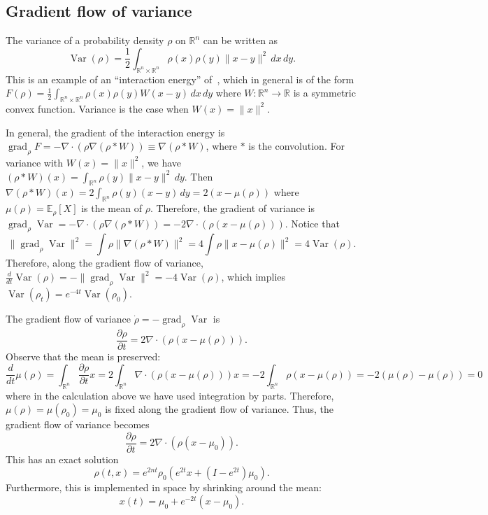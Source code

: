 \documentclass[final,12pt]{colt2018}
\newcommand{\R}{\mathbb{R}}
\newcommand{\E}{\mathbb{E}}
\renewcommand{\part}[2]{\frac{\partial #1}{\partial #2}}
\DeclareMathOperator{\grad}{grad}
\DeclareMathOperator{\Var}{Var}
\begin{document}
\subsection{Gradient flow of variance}
\label{App:Var}

The variance of a probability density $\rho$ on $\R^n$ can be written as
$$\Var(\rho) = \frac{1}{2} \int_{\R^n \times \R^n} \rho(x) \rho(y) \|x-y\|^2 \, dx \, dy.$$
This is an example of an ``interaction energy'' of~\cite[$\S5.2.2$]{Vil03}, which in general is of the form $F(\rho) = \frac{1}{2} \int_{\R^n \times \R^n} \rho(x) \rho(y) W(x-y) \, dx \, dy$ where $W \colon \R^n \to \R$ is a symmetric convex function.
Variance is the case when $W(x) = \|x\|^2$.

In general, the gradient of the interaction energy is $\grad_\rho F = -\nabla \cdot(\rho \nabla (\rho \ast W)) \equiv \nabla (\rho \ast W)$, where $\ast$ is the convolution.
For variance with $W(x) = \|x\|^2$, we have $(\rho \ast W)(x) = \int_{\R^n} \rho(y) \|x-y\|^2 \, dy$. 
Then $\nabla (\rho \ast W)(x) = 2 \int_{\R^n} \rho(y) (x-y) \, dy = 2(x-\mu(\rho))$ where $\mu(\rho) = \E_\rho[X]$ is the mean of $\rho$.
Therefore, the gradient of variance is
$\grad_\rho \Var = -\nabla \cdot (\rho \nabla (\rho \ast W)) = -2\nabla \cdot (\rho (x-\mu(\rho)))$.
Notice that
$$\|\grad_\rho \Var\|^2 = \int \rho \|\nabla (\rho \ast W)\|^2 = 4 \int \rho \|x-\mu(\rho)\|^2 = 4\Var(\rho).$$
Therefore, along the gradient flow of variance, $\frac{d}{dt} \Var(\rho) = -\|\grad_\rho \Var\|^2 = -4\Var(\rho)$, which implies $\Var(\rho_t) = e^{-4t} \Var(\rho_0)$.

The gradient flow of variance $\dot \rho = -\grad_\rho \Var$ is
$$\part{\rho}{t} = 2\nabla \cdot (\rho (x-\mu(\rho))).$$
Observe that the mean is preserved:
$$\frac{d}{dt} \mu(\rho) = \int_{\R^n} \part{\rho}{t} x = 2 \int_{\R^n} \nabla \cdot (\rho (x-\mu(\rho))) x = -2\int_{\R^n} \rho (x-\mu(\rho)) = -2(\mu(\rho)-\mu(\rho)) = 0$$
where in the calculation above we have used integration by parts.
Therefore, $\mu(\rho) = \mu(\rho_0) = \mu_0$ is fixed along the gradient flow of variance.
Thus, the gradient flow of variance becomes
$$\part{\rho}{t} = 2\nabla \cdot (\rho (x-\mu_0)).$$
This has an exact solution
$$\rho(t,x) = e^{2nt} \rho_0(e^{2t} x + (I-e^{2t})\mu_0).$$
Furthermore, this is implemented in space by shrinking around the mean:
$$x(t) = \mu_0 + e^{-2t}(x-\mu_0).$$
\end{document}
